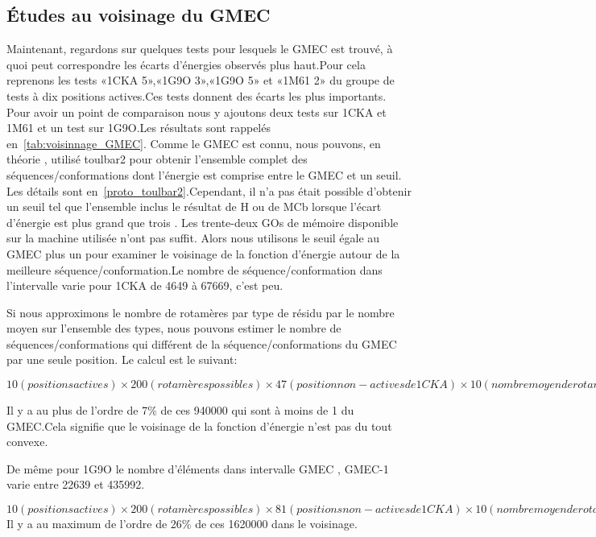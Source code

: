 \clearpage
   \subsection{Études au voisinage du GMEC}

Maintenant, regardons sur quelques tests pour lesquels le GMEC est trouvé, à quoi peut correspondre les écarts d'énergies observés plus haut.Pour cela reprenons les tests «1CKA 5»,«1G9O 3»,«1G9O 5» et «1M61 2» du groupe de tests à dix positions actives.Ces tests donnent des écarts les plus importants. Pour avoir un point de comparaison nous y ajoutons deux tests sur 1CKA et 1M61 et un test sur 1G9O.Les résultats sont rappelés en~\ref{tab:voisinnage_GMEC}. Comme le GMEC est connu, nous pouvons, en théorie , utilisé toulbar2 pour obtenir l'ensemble complet des séquences/conformations dont l'énergie est comprise entre le GMEC et un seuil. Les détails sont en~\ref{proto_toulbar2}.Cependant, il n'a pas était possible d'obtenir un seuil tel que l'ensemble inclus le résultat de H ou de MCb lorsque l'écart d'énergie est plus grand que trois . Les trente-deux GOs de mémoire disponible sur la machine utilisée n'ont pas suffit. Alors nous utilisons le seuil égale au GMEC plus un pour examiner le voisinage de la fonction d'énergie autour de la meilleure séquence/conformation.Le nombre de séquence/conformation dans l'intervalle varie pour 1CKA de 4649 à 67669, c'est peu. 

Si nous approximons le nombre de rotamères par type de résidu par le nombre moyen sur l'ensemble des types, nous pouvons estimer le nombre de séquences/conformations qui différent de la séquence/conformations du GMEC par une seule position. Le calcul est le suivant:

$10 (positions actives) \times 200 (rotamères possibles) \times 47 (position non-actives de 1CKA) \times 10 (nombre moyen de rotamères par résidu)=940000 $

Il y a au plus de l'ordre de 7\% de ces 940000 qui sont à moins de 1 du GMEC.Cela signifie que le voisinage de la fonction d'énergie n'est pas du tout convexe.


De même pour 1G9O le nombre d'éléments dans intervalle GMEC , GMEC-1 varie entre 22639 et 435992.


$10 (positions  actives) \times 200 (rotamères  possibles) \times 81 (positions  non-actives de 1CKA) \times 10 (nombre  moyen  de  rotamères  par  résidu)=1620000 $
Il y a au maximum de l'ordre de 26\% de ces 1620000 dans le voisinage.

